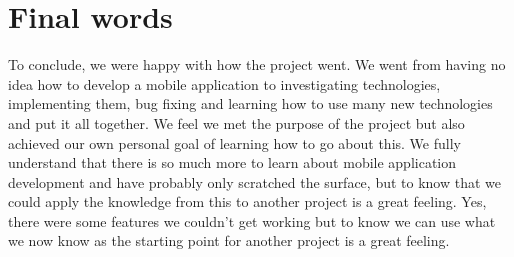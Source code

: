 \section{Final words}
To conclude, we were happy with how the project went. We went from having no idea how to develop a mobile application to investigating technologies, implementing them, bug fixing and learning how to use many new technologies and put it all together. We feel we met the purpose of the project but also achieved our own personal goal of learning how to go about this. We fully understand that there is so much more to learn about mobile application development and have probably only scratched the surface, but to know that we could apply the knowledge from this to another project is a great feeling. Yes, there were some features we couldn't get working but to know we can use what we now know as the starting point for another project is a great feeling.